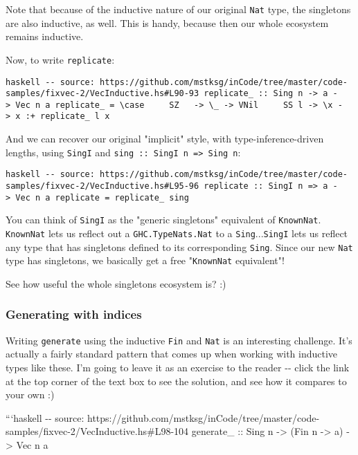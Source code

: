 \documentclass[]{article}
\begin{document}
Note that because of the inductive nature of our original \texttt{Nat} type, the
singletons are also inductive, as well. This is handy, because then our whole
ecosystem remains inductive.

Now, to write \texttt{replicate}:

\texttt{haskell\ -\/-\ source:\ https://github.com/mstksg/inCode/tree/master/code-samples/fixvec-2/VecInductive.hs\#L90-93\ replicate\_\ ::\ Sing\ n\ -\textgreater{}\ a\ -\textgreater{}\ Vec\ n\ a\ replicate\_\ =\ \textbackslash{}case\ \ \ \ \ SZ\ \ \ -\textgreater{}\ \textbackslash{}\_\ -\textgreater{}\ VNil\ \ \ \ \ SS\ l\ -\textgreater{}\ \textbackslash{}x\ -\textgreater{}\ x\ :+\ replicate\_\ l\ x}

And we can recover our original "implicit" style, with type-inference-driven
lengths, using \texttt{SingI} and
\texttt{sing\ ::\ SingI\ n\ =\textgreater{}\ Sing\ n}:

\texttt{haskell\ -\/-\ source:\ https://github.com/mstksg/inCode/tree/master/code-samples/fixvec-2/VecInductive.hs\#L95-96\ replicate\ ::\ SingI\ n\ =\textgreater{}\ a\ -\textgreater{}\ Vec\ n\ a\ replicate\ =\ replicate\_\ sing}

You can think of \texttt{SingI} as the "generic singletons" equivalent of
\texttt{KnownNat}. \texttt{KnownNat} lets us reflect out a
\texttt{GHC.TypeNats.Nat} to a \texttt{Sing}...\texttt{SingI} lets us reflect
any type that has singletons defined to its corresponding \texttt{Sing}. Since
our new \texttt{Nat} type has singletons, we basically get a free
"\texttt{KnownNat} equivalent"!

See how useful the whole singletons ecosystem is? :)

\subsubsection{Generating with indices}

Writing \texttt{generate} using the inductive \texttt{Fin} and \texttt{Nat} is
an interesting challenge. It's actually a fairly standard pattern that comes up
when working with inductive types like these. I'm going to leave it as an
exercise to the reader -\/- click the link at the top corner of the text box to
see the solution, and see how it compares to your own :)

```haskell -\/- source:
https://github.com/mstksg/inCode/tree/master/code-samples/fixvec-2/VecInductive.hs\#L98-104
generate\_ :: Sing n -\textgreater{} (Fin n -\textgreater{} a) -\textgreater{}
Vec n a
\end{document}
